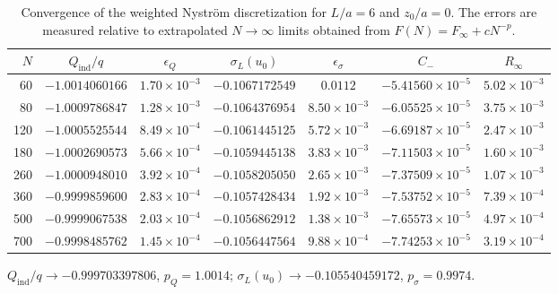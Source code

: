 \documentclass[12pt]{article}
\begin{document}
\begin{table}[ht]
\centering
\caption{Convergence of the weighted Nystr\"om discretization for $L/a=6$ and $z_0/a=0$. The errors are measured relative to extrapolated $N\rightarrow\infty$ limits obtained from $F(N)=F_{\infty}+cN^{-p}$.}
\label{tab:convergence}

\begin{tabular}{rcccccc}
\hline
\hline
$N$ & $Q_{\mathrm{ind}}/q$ & $\epsilon_Q$ & $\sigma_L(u_0)$ & $\epsilon_{\sigma}$ & $C_{-}$ & $R_{\infty}$ \\
\hline
60 & $-1.0014060166$ & $1.70\times 10^{-3}$ & $-0.1067172549$ & $0.0112$ & $-5.41560\times 10^{-5}$ & $5.02\times 10^{-3}$ \\
80 & $-1.0009786847$ & $1.28\times 10^{-3}$ & $-0.1064376954$ & $8.50\times 10^{-3}$ & $-6.05525\times 10^{-5}$ & $3.75\times 10^{-3}$ \\
120 & $-1.0005525544$ & $8.49\times 10^{-4}$ & $-0.1061445125$ & $5.72\times 10^{-3}$ & $-6.69187\times 10^{-5}$ & $2.47\times 10^{-3}$ \\
180 & $-1.0002690573$ & $5.66\times 10^{-4}$ & $-0.1059445138$ & $3.83\times 10^{-3}$ & $-7.11503\times 10^{-5}$ & $1.60\times 10^{-3}$ \\
260 & $-1.0000948010$ & $3.92\times 10^{-4}$ & $-0.1058205050$ & $2.65\times 10^{-3}$ & $-7.37509\times 10^{-5}$ & $1.07\times 10^{-3}$ \\
360 & $-0.9999859600$ & $2.83\times 10^{-4}$ & $-0.1057428434$ & $1.92\times 10^{-3}$ & $-7.53752\times 10^{-5}$ & $7.39\times 10^{-4}$ \\
500 & $-0.9999067538$ & $2.03\times 10^{-4}$ & $-0.1056862912$ & $1.38\times 10^{-3}$ & $-7.65573\times 10^{-5}$ & $4.97\times 10^{-4}$ \\
700 & $-0.9998485762$ & $1.45\times 10^{-4}$ & $-0.1056447564$ & $9.88\times 10^{-4}$ & $-7.74253\times 10^{-5}$ & $3.19\times 10^{-4}$ \\
\hline
\hline
\end{tabular}

\begin{flushleft}$Q_{\mathrm{ind}}/q\rightarrow -0.999703397806$, $p_Q=1.0014$; $\sigma_L(u_0)\rightarrow -0.105540459172$, $p_\sigma=0.9974$.\end{flushleft}
\end{table}
\end{document}
